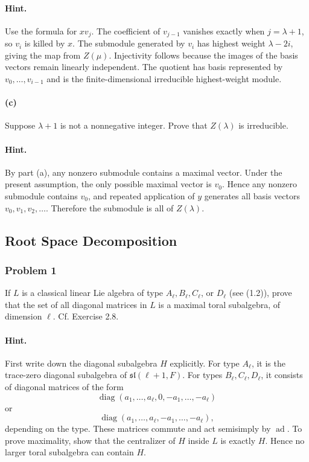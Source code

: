 \documentclass[12pt, a4paper]{article}
\begin{document}
\paragraph{Hint.}
Use the formula for \(xv_j\). The coefficient of \(v_{j-1}\) vanishes exactly
when \(j=\lambda+1\), so \(v_i\) is killed by \(x\). The submodule generated by
\(v_i\) has highest weight \(\lambda-2i\), giving the map from \(Z(\mu)\).
Injectivity follows because the images of the basis vectors remain linearly
independent. The quotient has basis represented by \(v_0,\ldots,v_{i-1}\) and
is the finite-dimensional irreducible highest-weight module.

\paragraph{(c)}
Suppose \(\lambda+1\) is not a nonnegative integer. Prove that \(Z(\lambda)\)
is irreducible.

\paragraph{Hint.}
By part (a), any nonzero submodule contains a maximal vector. Under the present
assumption, the only possible maximal vector is \(v_0\). Hence any nonzero
submodule contains \(v_0\), and repeated application of \(y\) generates all
basis vectors \(v_0,v_1,v_2,\ldots\). Therefore the submodule is all of
\(Z(\lambda)\).

\subsection{Root Space Decomposition}

\subsubsection{Problem 1}

If \(L\) is a classical linear Lie algebra of type \(A_\ell,B_\ell,C_\ell\), or
\(D_\ell\) (see (1.2)), prove that the set of all diagonal matrices in \(L\) is
a maximal toral subalgebra, of dimension \(\ell\). Cf. Exercise 2.8.

\paragraph{Hint.}
First write down the diagonal subalgebra \(H\) explicitly. For type \(A_\ell\),
it is the trace-zero diagonal subalgebra of \(\mathfrak{sl}(\ell+1,F)\). For
types \(B_\ell,C_\ell,D_\ell\), it consists of diagonal matrices of the form
\[
\operatorname{diag}(a_1,\ldots,a_\ell,0,-a_1,\ldots,-a_\ell)
\]
or
\[
\operatorname{diag}(a_1,\ldots,a_\ell,-a_1,\ldots,-a_\ell),
\]
depending on the type. These matrices commute and act semisimply by
\(\operatorname{ad}\). To prove maximality, show that the centralizer of \(H\)
inside \(L\) is exactly \(H\). Hence no larger toral subalgebra can contain
\(H\).
\end{document}
